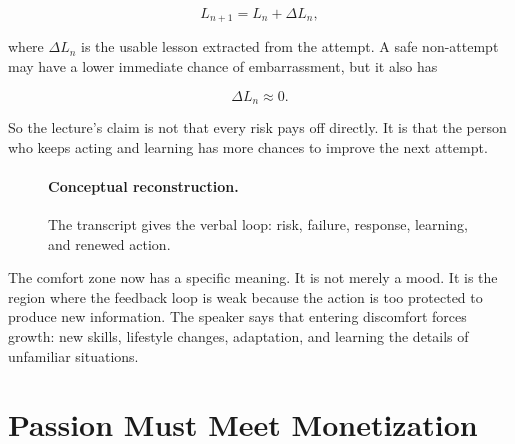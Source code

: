 \begin{equation}
L_{n+1}=L_n+\Delta L_n,
\end{equation}

where \(\Delta L_n\) is the usable lesson extracted from the attempt. A safe non-attempt may have a lower immediate chance of embarrassment, but it also has

\begin{equation}
\Delta L_n \approx 0.
\end{equation}

So the lecture's claim is not that every risk pays off directly. It is that the person who keeps acting and learning has more chances to improve the next attempt.

\begin{figure}
\centering
{}

\paragraph{Conceptual reconstruction.}
The transcript gives the verbal loop: risk, failure, response, learning, and renewed action.
\end{figure}

The comfort zone now has a specific meaning. It is not merely a mood. It is the region where the feedback loop is weak because the action is too protected to produce new information. The speaker says that entering discomfort forces growth: new skills, lifestyle changes, adaptation, and learning the details of unfamiliar situations.

\section{Passion Must Meet Monetization}

